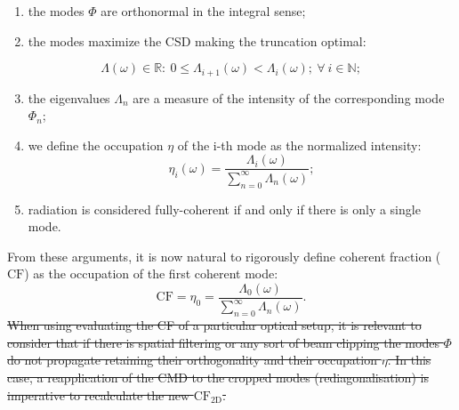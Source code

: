 \documentclass{iucr}              %
\newcommand{\remove}[1]{ {\color{blue} \sout{#1}}}
\begin{document}
\begin{enumerate}[label=(\roman*)]
\item the modes $\Phi$ are orthonormal in the integral sense;
\item the modes maximize the CSD making the truncation optimal:
\end{enumerate}
\begin{equation*}
\Lambda(\omega) \in \mathbb{R}
:~0\leq \Lambda_{i+1}(\omega)<\Lambda_i(\omega);~\forall~i \in \mathbb{N};
\end{equation*}
\begin{enumerate}[label=(\roman*)]
\setcounter{enumi}{2}
\item the eigenvalues $\Lambda_n$ are a measure of the intensity of the corresponding mode $\Phi_{n}$; 
\item we define the occupation $\eta$ of the i-th mode as the normalized intensity: 
\begin{equation}
\eta_i(\omega) =\frac{\Lambda_i(\omega)}{\sum\limits_{n=0}^\infty{\Lambda_n(\omega)}};
\end{equation}
\item radiation is considered fully-coherent if and only if there is only a single mode.
\end{enumerate}

From these arguments, it is now natural to rigorously define coherent fraction ($\text{CF}$) as the occupation of the first coherent mode:
\begin{equation}
\text{CF}=\eta_0=\frac{\Lambda_0(\omega)}{\sum\limits_{n=0}^\infty{\Lambda_n(\omega)}}. \label{eq:CF2D}
\end{equation}
\remove{When using evaluating the CF of a particular optical setup, it is relevant to consider that if there is spatial filtering or any sort of beam clipping the modes $\Phi$ do not propagate retaining their orthogonality and their occupation $\eta$. In this case, a reapplication of the CMD to the cropped modes (rediagonalisation) is imperative to recalculate the new $\text{CF}_\text{2D}$.}
\end{document}

